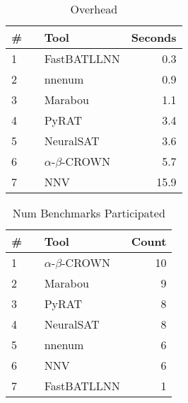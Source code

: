 


\begin{table}[h]
\begin{center}
\caption{Overhead} \label{tab:overhead}
{\setlength{\tabcolsep}{2pt}
\begin{tabular}[h]{@{}llr@{}}
\toprule
\textbf{\# ~} & \textbf{Tool} & \textbf{Seconds}\\
\midrule
1 & FastBATLLNN & 0.3 \\
2 & nnenum & 0.9 \\
3 & Marabou & 1.1 \\
4 & PyRAT & 3.4 \\
5 & NeuralSAT & 3.6 \\
6 & $\alpha$-$\beta$-CROWN & 5.7 \\
7 & NNV & 15.9 \\
\bottomrule
\end{tabular}
}
\end{center}
\end{table}




\begin{table}[h]
\begin{center}
\caption{Num Benchmarks Participated} \label{tab:stats0}
{\setlength{\tabcolsep}{2pt}
\begin{tabular}[h]{@{}llr@{}}
\toprule
\textbf{\# ~} & \textbf{Tool} & \textbf{Count}\\
\midrule
1 & $\alpha$-$\beta$-CROWN & 10 \\
2 & Marabou & 9 \\
3 & PyRAT & 8 \\
4 & NeuralSAT & 8 \\
5 & nnenum & 6 \\
6 & NNV & 6 \\
7 & FastBATLLNN & 1 \\
\bottomrule
\end{tabular}
}
\end{center}
\end{table}




